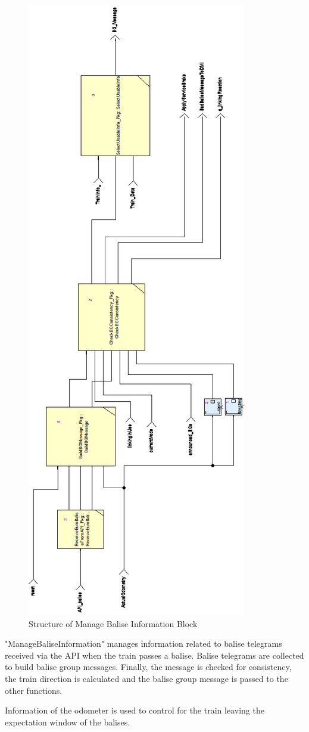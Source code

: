 \documentclass{template/openetcs_report}
\begin{document}
\begin{figure}[hbtp]
\centering
\includegraphics[width=.5\textwidth]{../images/ManageBaliseInformation.png}
\caption{Structure of Manage Balise Information Block}
\end{figure}

"ManageBaliseInformation" manages information related to balise telegrams received via the API when the train passes a balise. Balise telegrams are collected to build balise group messages. Finally, the message is checked for consistency, the train direction is calculated and the balise group message  is passed to the other functions.

Information of the odometer is used to control for the train leaving the expectation window of the balises.
\end{document}
